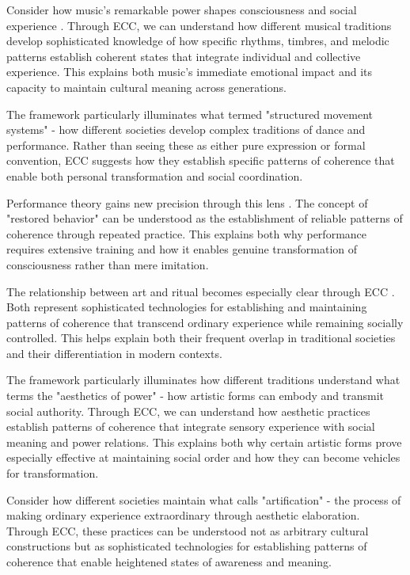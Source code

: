 \begin{refsection}
Consider how music's remarkable power shapes consciousness and social experience \cite{feld1982sound}. Through ECC, we can understand how different musical traditions develop sophisticated knowledge of how specific rhythms, timbres, and melodic patterns establish coherent states that integrate individual and collective experience. This explains both music's immediate emotional impact and its capacity to maintain cultural meaning across generations.

The framework particularly illuminates what \cite{kaeppler1985structured} termed "structured movement systems" - how different societies develop complex traditions of dance and performance. Rather than seeing these as either pure expression or formal convention, ECC suggests how they establish specific patterns of coherence that enable both personal transformation and social coordination.

Performance theory gains new precision through this lens \cite{schechner1985between}. The concept of "restored behavior" can be understood as the establishment of reliable patterns of coherence through repeated practice. This explains both why performance requires extensive training and how it enables genuine transformation of consciousness rather than mere imitation.

The relationship between art and ritual becomes especially clear through ECC \cite{turner1982ritual}. Both represent sophisticated technologies for establishing and maintaining patterns of coherence that transcend ordinary experience while remaining socially controlled. This helps explain both their frequent overlap in traditional societies and their differentiation in modern contexts.

The framework particularly illuminates how different traditions understand what \cite{morphy1991ancestral} terms the "aesthetics of power" - how artistic forms can embody and transmit social authority. Through ECC, we can understand how aesthetic practices establish patterns of coherence that integrate sensory experience with social meaning and power relations. This explains both why certain artistic forms prove especially effective at maintaining social order and how they can become vehicles for transformation.

Consider how different societies maintain what \cite{dissanayake1992homo} calls "artification" - the process of making ordinary experience extraordinary through aesthetic elaboration. Through ECC, these practices can be understood not as arbitrary cultural constructions but as sophisticated technologies for establishing patterns of coherence that enable heightened states of awareness and meaning.


\end{refsection}

